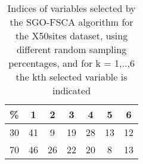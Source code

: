 \begin{table}
	\begin{center}
		\begin{tabular}{c c c c c c c}
			\% & 1 & 2 & 3 & 4 & 5 & 6 \\
			\hline
			30 & 41 & 9 & 19 & 28 & 13 & 12 \\
			70 & 46 & 26 & 22 & 20 & 8 & 13 \\
		\end{tabular}
	\end{center}
	\caption{Indices of variables selected by the SGO-FSCA algorithm for the X50sites dataset, using different random sampling percentages, and for k = 1,..,6 the kth selected variable is indicated}
\end{table}